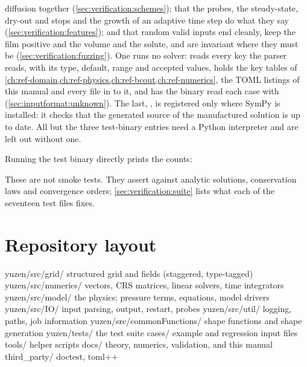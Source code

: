 diffusion together (\cref{sec:verification:schemes});
 that the probes, the
steady-state, dry-out and  stops and the growth of an adaptive
time step do what they say (\cref{sec:verification:features}); and
 that random valid inputs end cleanly, keep the film positive
and the volume and the solute, and are invariant where they must be
(\cref{sec:verification:fuzzing}). One runs no
solver:  reads every key the parser reads, with its type,
default, range and accepted values, holds the key tables of
\cref{ch:ref-domain,ch:ref-physics,ch:ref-bcout,ch:ref-numerics}, the TOML
listings of this manual and every file in  to it, and has the
binary read each case with 
(\cref{sec:inputformat:unknown}). The last,
, is registered only where SymPy is installed: it
checks that the generated source of the manufactured solution is up to date.
All but the three test-binary entries need a Python interpreter and are left
out without one.

Running the test binary directly prints the counts:


These are not smoke tests. They assert against analytic solutions, conservation
laws and convergence orders; \cref{sec:verification:suite} lists what each of
the seventeen test files fixes.

\section{Repository layout}
\label{sec:install:layout}

\begin{plain}
yuzen/src/grid/        structured grid and fields (staggered, type-tagged)
yuzen/src/numerics/    vectors, CRS matrices, linear solvers, time integrators
yuzen/src/model/       the physics: pressure terms, equations, model drivers
yuzen/src/IO/          input parsing, output, restart, probes
yuzen/src/util/        logging, paths, job information
yuzen/src/commonFunctions/   shape functions and shape generation
yuzen/tests/           the test suite
cases/                 example and regression input files
tools/                 helper scripts
docs/                  theory, numerics, validation, and this manual
third_party/           doctest, toml++
\end{plain}

